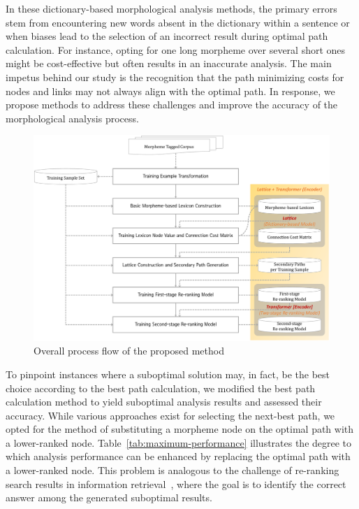 \documentclass[AMS,STIX2COL]{WileyNJD-v2}
\begin{document}
    In these dictionary-based morphological analysis methods, the primary errors stem from encountering new words absent in the dictionary within a sentence or when biases lead to the selection of an incorrect result during optimal path calculation.
    For instance, opting for one long morpheme over several short ones might be cost-effective but often results in an inaccurate analysis.
    The main impetus behind our study is the recognition that the path minimizing costs for nodes and links may not always align with the optimal path.
    In response, we propose methods to address these challenges and improve the accuracy of the morphological analysis process.

    \begin{figure}[ht]
        \centerline{\includegraphics[width=1.0\textwidth]{fig;block-v1}}
        \caption{Overall process flow of the proposed method}
        \label{fig:block}
    \end{figure}

    To pinpoint instances where a suboptimal solution may, in fact, be the best choice according to the best path calculation, we modified the best path calculation method to yield suboptimal analysis results and assessed their accuracy.
    While various approaches exist for selecting the next-best path, we opted for the method of substituting a morpheme node on the optimal path with a lower-ranked node.
    Table~\ref{tab:maximum-performance} illustrates the degree to which analysis performance can be enhanced by replacing the optimal path with a lower-ranked node.
    This problem is analogous to the challenge of re-ranking search results in information retrieval~\cite{BaeYJ2021}, where the goal is to identify the correct answer among the generated suboptimal results.
\end{document}

